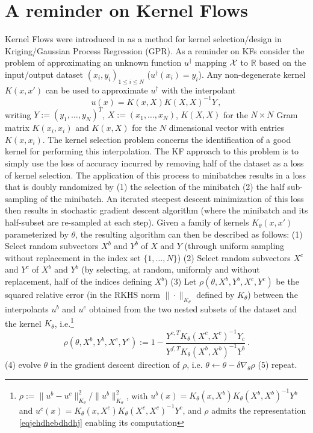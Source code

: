 \documentclass[11pt]{article}
\def\R{\mathbb{R}}
\def\X{{\bf\mathcal{X}}}
\begin{document}
\section{A reminder on Kernel Flows}

 Kernel Flows were introduced in \cite{owhadi2019kernel} as a method for kernel selection/design in Kriging/Gaussian Process Regression (GPR).
 As a reminder on KFs consider the problem of approximating an unknown function $u^\dagger$ mapping $\X$ to $\R$   based on the input/output dataset $(x_i,y_i)_{1\leq i \leq N}$ ($u^\dagger(x_i)=y_i$).
 Any non-degenerate kernel $K(x,x')$ can be used to approximate $u^\dagger$ with the interpolant
 \begin{equation}
 u(x)=K(x,X) K(X,X)^{-1} Y\,,
  \end{equation}
writing $Y:=(y_1,\ldots,y_N)^T$, $X:=(x_1,\ldots,x_N)$, $K(X,X)$ for the $N\times N$ Gram matrix $K(x_i,x_i)$ and $K(x,X)$ for the $N$ dimensional vector with entries $K(x,x_i)$.
 The kernel selection problem concerns the identification of a good kernel for performing this interpolation. The KF approach to this problem is to simply use the loss of accuracy incurred by removing half of the dataset as a loss of kernel selection. The application of this process to minibatches results in a loss that is doubly randomized by (1) the selection of the minibatch (2) the half sub-sampling of the minibatch. An iterated steepest descent minimization of this loss then results in stochastic  gradient descent algorithm (where the minibatch and its half-subset  are re-sampled at each step).
 Given a family of kernels $K_\theta(x,x')$ parameterized by $\theta$, the resulting algorithm can then be described as follows:
 (1) Select random subvectors $X^b$ and $Y^b$ of $X$ and $Y$ (through uniform sampling without replacement in the index set $\{1,\ldots,N\}$) (2) Select random subvectors $X^c$ and $Y^c$ of $X^b$ and $Y^b$ (by selecting, at random, uniformly and without replacement, half of the indices defining $X^b$) (3) Let $\rho(\theta,X^b,Y^b,X^c,Y^c)$ be the squared relative error (in the RKHS norm $\|\cdot\|_{K_\theta}$ defined by $K_\theta$)  between
 the interpolants $u^b$ and $u^c$ obtained from the two nested subsets of the dataset and the kernel $K_\theta$, i.e.\footnote{ $\rho:=\|u^b-u^c\|^2_{K_\theta}/\|u^b\|^2_{K_\theta}$, with $u^b(x)=K_\theta(x,X^b) K_\theta(X^b,X^b)^{-1} Y^b$ and $u^c(x)=K_\theta(x,X^c) K_\theta(X^c,X^c)^{-1} Y^c$, and $\rho$  admits \cite[Prop.~13.29]{owhadi2019operator} the representation \eqref{eqjehdhebdhdhj} enabling its computation}
 \begin{equation}\label{eqjehdhebdhdhj}
 \rho(\theta,X^b,Y^b,X^c,Y^c):=1-\frac{Y^{c,T} K_\theta(X^c,X^c)^{-1} Y_c}{Y^{f,T} K_\theta(X^b,X^b)^{-1} Y^b}\,.
 \end{equation}
 (4) evolve $\theta$ in the gradient descent direction of $\rho$, i.e. $\theta \leftarrow \theta - \delta \nabla_\theta \rho$ (5) repeat.
\end{document}
